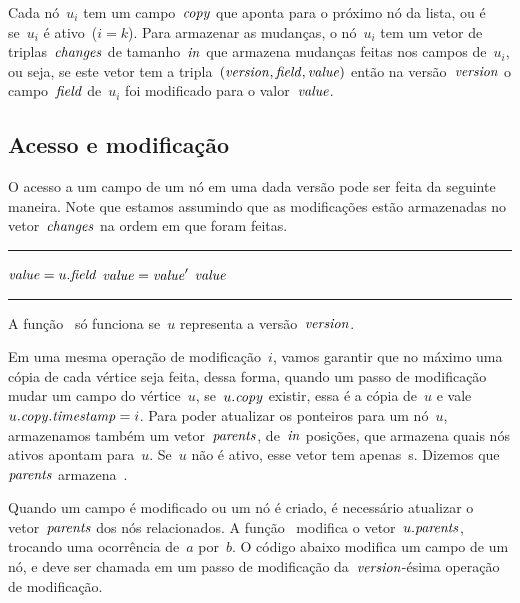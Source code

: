 \documentclass[../../main.tex]{subfiles}
\begin{document}
Cada nó~$u_i$ tem um campo~$\mathit{copy}$ que aponta para o próximo nó da lista, ou é~ se~$u_i$ é ativo~($i=k$). Para armazenar as mudanças, o nó~$u_i$ tem um vetor de triplas~$\mathit{changes}$ de tamanho~$\mathit{in}$ que armazena mudanças feitas nos campos de~$u_i$, ou seja, se este vetor tem a tripla~$(\mathit{version}, \mathit{field}, \mathit{value})$ então na versão~$\mathit{version}$ o campo~$\mathit{field}$ de~$u_i$ foi modificado para o valor~$\mathit{value}$.

\subsection{Acesso e modificação}

O acesso a um campo de um nó em uma dada versão pode ser feita da seguinte maneira. Note que estamos assumindo que as modificações estão armazenadas no vetor~$\mathit{changes}$ na ordem em que foram feitas.

\vspace{1em}
\hrule
\begin{algorithmic}[1]

	\State $\mathit{value} = u.\mathit{field}$
			\State $\mathit{value} = \mathit{value}'$
		\EndIf
	\EndFor
	\State \Return $\mathit{value}$
\EndFunction

\end{algorithmic}
\hrule
\vspace{1em}

A função~ só funciona se~$u$ representa a versão~$\mathit{version}$.

Em uma mesma operação de modificação~$i$, vamos garantir que no máximo uma cópia de cada vértice seja feita, dessa forma, quando um passo de modificação mudar um campo do vértice~$u$, se~$u.\mathit{copy}$ existir, essa é a cópia de~$u$ e vale~$u.\mathit{copy}.\mathit{timestamp} = i$.
Para poder atualizar os ponteiros para um nó~$u$, armazenamos também um vetor~$\mathit{parents}$, de~$\mathit{in}$ posições, que armazena quais nós ativos apontam para~$u$. Se~$u$ não é ativo, esse vetor tem apenas~s. Dizemos que~$\mathit{parents}$ armazena~.

Quando um campo é modificado ou um nó é criado, é necessário atualizar o vetor~$\mathit{parents}$ dos nós relacionados. A função~ modifica o vetor~$u.\mathit{parents}$, trocando uma ocorrência de~$a$ por~$b$. O código abaixo modifica um campo de um nó, e deve ser chamada em um passo de modificação da~$\mathit{version}$-ésima operação de modificação.
\end{document}
